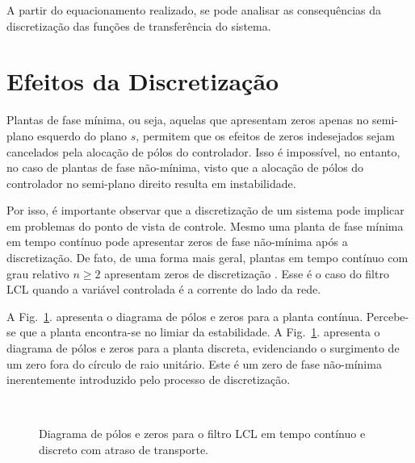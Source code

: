   A partir do equacionamento realizado, se pode analisar as consequências da discretização das funções de transferência do sistema.


\section{Efeitos da Discretização}

  Plantas de fase mínima, ou seja, aquelas que apresentam zeros apenas no semi-plano esquerdo do plano $s$, permitem que os efeitos de zeros indesejados sejam cancelados pela alocação de pólos do controlador. Isso é impossível, no entanto, no caso de plantas de fase não-mínima, visto que a alocação de pólos do controlador no semi-plano direito resulta em instabilidade.

  Por isso, é importante observar que a discretização de um sistema pode implicar em problemas do ponto de vista de controle. Mesmo uma planta de fase mínima em tempo contínuo pode apresentar zeros de fase não-mínima após a discretização. De fato, de uma forma mais geral, plantas em tempo contínuo com grau relativo $n \ge 2$ apresentam zeros de discretização \cite{ref:ASTROM}. Esse é o caso do filtro LCL quando a variável controlada é a corrente do lado da rede.


  A Fig.~\ref{fig:pzmap_planta}. apresenta o diagrama de pólos e zeros para a planta contínua. Percebe-se que a planta encontra-se no limiar da estabilidade. A Fig.~\ref{fig:pzmap_planta}. apresenta o diagrama de pólos e zeros para a planta discreta, evidenciando o surgimento de um zero fora do círculo de raio unitário. Este é um zero de fase não-mínima inerentemente introduzido pelo processo de discretização.

  \begin{figure}[htb]
    \centering
    \\
    \renewcommand\figurename{Fig.}
    \caption{Diagrama de pólos e zeros para o filtro LCL em tempo contínuo e discreto com atraso de transporte.}
    \label{fig:pzmap_planta}
  \end{figure}


